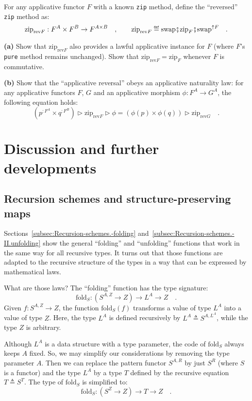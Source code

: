 For any applicative functor $F$ with a known \lstinline!zip! method,
define the \textsf{``}reversed\textsf{''} \lstinline!zip! method as:
\[
\text{zip}_{\text{rev}F}:F^{A}\times F^{B}\rightarrow F^{A\times B}\quad,\quad\quad\text{zip}_{\text{rev}F}\triangleq\text{swap}\bef\text{zip}_{F}\bef\text{swap}^{\uparrow F}\quad.
\]

\textbf{(a)} Show that $\text{zip}_{\text{rev}F}$ also provides a
lawful applicative instance for $F$ (where $F$\textsf{'}s \lstinline!pure!
method remains unchanged). Show that $\text{zip}_{\text{rev}F}=\text{zip}_{F}$
whenever $F$ is commutative.

\textbf{(b)} Show that the \textsf{``}applicative reversal\textsf{''} obeys an applicative
naturality law: for any applicative functors $F$, $G$ and an applicative
morphism $\phi:F^{A}\rightarrow G^{A}$, the following equation holds:
\[
(p^{:F^{A}}\times q^{:F^{B}})\triangleright\text{zip}_{\text{rev}F}\triangleright\phi=(\phi(p)\times\phi(q))\triangleright\text{zip}_{\text{rev}G}\quad.
\]


\section{Discussion and further developments}

\subsection{Recursion schemes and structure-preserving maps}

Sections~\ref{subsec:Recursion-schemes.-folding} and~\ref{subsec:Recursion-schemes.-II.unfolding}
show the general \textsf{``}folding\textsf{''} and \textsf{``}unfolding\textsf{''} functions that
work in the same way for all recursive types. It turns out that those
functions are adapted to the recursive structure of the types in a
way that can be expressed by mathematical laws.

What are those laws? The \textsf{``}folding\textsf{''} function has the type signature:
\[
\text{fold}_{S}:(S^{A,Z}\rightarrow Z)\rightarrow L^{A}\rightarrow Z\quad.
\]
Given $f:S^{A,Z}\rightarrow Z$, the function $\text{fold}_{S}(f)$
transforms a value of type $L^{A}$ into a value of type $Z$. Here,
the type $L^{A}$ is defined recursively by $L^{A}\triangleq S^{A,L^{A}}$,
while the type $Z$ is arbitrary. 

Although $L^{A}$ is a data structure with a type parameter, the code
of $\text{fold}_{S}$ always keeps $A$ fixed. So, we may simplify
our considerations by removing the type parameter $A$. Then we can
replace the pattern functor $S^{A,R}$ by just $S^{R}$ (where $S$
is a functor) and the type $L^{A}$ by a type $T$ defined by the
recursive equation $T\triangleq S^{T}$. The type of $\text{fold}_{S}$
is simplified to:
\[
\text{fold}_{S}:(S^{Z}\rightarrow Z)\rightarrow T\rightarrow Z\quad.
\]

